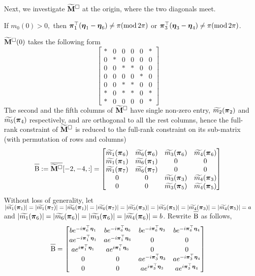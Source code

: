 Next, we investigate $\widetilde{\mathbf{M}}^{\Box}$ at the origin, where the two diagonals meet.
\begin{proposition}\label{prop: origin-det}
If $m_0(0) > 0,$ then $\boldsymbol{\pi}_1^\top(\boldsymbol{\eta}_1-\boldsymbol{\eta}_6)\neq \pi(\text{mod}\,2\pi)$ or $\boldsymbol{\pi}_3^\top(\boldsymbol{\eta}_3-\boldsymbol{\eta}_4)\neq \pi(\text{mod}\,2\pi)$. 
\end{proposition}
$\widetilde{\mathbf{M}}^{\Box}(0)$ takes the following form
$$\begin{bmatrix}
* & 0 & 0 & 0 & 0 & *\\
0 & * & 0 & 0 & 0 & 0\\
0 & 0 & * & * & 0 & 0\\
0 & 0 & 0 & 0 & * & 0\\
0 & 0 & * & * & 0 & 0\\
* & 0 & * & * & 0 & *\\
* & 0 & 0 & 0 & 0 & *
\end{bmatrix}$$
The second and the fifth columns of $\widetilde{\mathbf{M}}^{\Box}$ have single non-zero entry, $\widetilde{m_2}(\boldsymbol{\pi}_2)$ and $\widetilde{m_5}(\boldsymbol{\pi}_4)$ respectively, and are orthogonal to all the rest columns, hence the full-rank constraint of $\widetilde{\mathbf{M}}^{\Box}$ is reduced to the full-rank constraint on its sub-matrix (with permutation of rows and columns)
$$ \overline{\mbox{B\strut}} := \overline{\widetilde{\mathbf{M}}^{\Box}}[-2,-4,:]=
\begin{bmatrix}
& & & \\[-1em]
\widetilde{m_1}(\boldsymbol{\pi}_6) & \widetilde{m_6}(\boldsymbol{\pi}_6) & \widetilde{m_3}(\boldsymbol{\pi}_6) & \widetilde{m_4}(\boldsymbol{\pi}_6) \\
\widetilde{m_1}(\boldsymbol{\pi}_1) & \widetilde{m_6}(\boldsymbol{\pi}_1) & 0 & 0\\
\widetilde{m_1}(\boldsymbol{\pi}_7) & \widetilde{m_6}(\boldsymbol{\pi}_7) & 0 & 0\\
0 & 0 & \widetilde{m_3}(\boldsymbol{\pi}_3) & \widetilde{m_4}(\boldsymbol{\pi}_3)\\
0 & 0 & \widetilde{m_3}(\boldsymbol{\pi}_5) & \widetilde{m_4}(\boldsymbol{\pi}_5)\\
\end{bmatrix}
$$
Without loss of generality, let $|\widetilde{m_1}(\boldsymbol{\pi}_1)| = |\widetilde{m_1}(\boldsymbol{\pi}_7)| = |\widetilde{m_6}(\boldsymbol{\pi}_1)| = |\widetilde{m_6}(\boldsymbol{\pi}_7)| = |\widetilde{m_3}(\boldsymbol{\pi}_3)| = |\widetilde{m_3}(\boldsymbol{\pi}_5)| = |\widetilde{m_4}(\boldsymbol{\pi}_3)| = |\widetilde{m_4}(\boldsymbol{\pi}_5)|= a$ and $|\widetilde{m_1}(\boldsymbol{\pi}_6)|=| \widetilde{m_6}(\boldsymbol{\pi}_6)|= | \widetilde{m_3}(\boldsymbol{\pi}_6)|=| \widetilde{m_4}(\boldsymbol{\pi}_6)|=b$. Rewrite $\overline{\mbox{B\strut}}$ as follows,
$$\overline{\mbox{B\strut}}=
\begin{bmatrix}
b e^{-i\boldsymbol{\pi}_6^\top\boldsymbol{\eta}_1} & b e^{-i\boldsymbol{\pi}_6^\top\boldsymbol{\eta}_6} & b e^{-i\boldsymbol{\pi}_6^\top\boldsymbol{\eta}_3} & b e^{-i\boldsymbol{\pi}_6^\top\boldsymbol{\eta}_4}\\
a e^{-i\boldsymbol{\pi}_1^\top\boldsymbol{\eta}_1} & a e^{-i\boldsymbol{\pi}_1^\top\boldsymbol{\eta}_6} & 0						& 0 \\
a e^{i\boldsymbol{\pi}_1^\top\boldsymbol{\eta}_1} & a e^{i\boldsymbol{\pi}_1^\top\boldsymbol{\eta}_6} & 0						& 0 \\
0 					& 0 					& a e^{-i\boldsymbol{\pi}_3^\top\boldsymbol{\eta}_3} & a e^{-i\boldsymbol{\pi}_3^\top\boldsymbol{\eta}_4}\\
0 					& 0 					& a e^{i\boldsymbol{\pi}_3^\top\boldsymbol{\eta}_3} & a e^{i\boldsymbol{\pi}_3^\top\boldsymbol{\eta}_4}\\
\end{bmatrix}
$$
